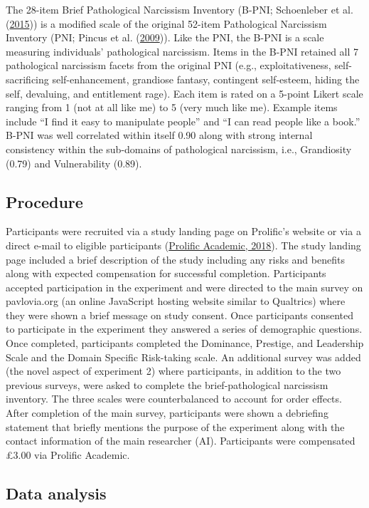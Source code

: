 \documentclass[
  donotrepeattitle,doc, 12pt, a4paper,floatsintext]{apa7}
\begin{document}
The 28-item Brief Pathological Narcissism Inventory (B-PNI; Schoenleber et al. (\protect\hyperlink{ref-schoenleber2015}{2015})) is a modified scale of the original 52-item Pathological Narcissism Inventory (PNI; Pincus et al. (\protect\hyperlink{ref-pincus2009}{2009})). Like the PNI, the B-PNI is a scale measuring individuals' pathological narcissism. Items in the B-PNI retained all 7 pathological narcissism facets from the original PNI (e.g., exploitativeness, self-sacrificing self-enhancement, grandiose fantasy, contingent self-esteem, hiding the self, devaluing, and entitlement rage). Each item is rated on a 5-point Likert scale ranging from 1 (not at all like me) to 5 (very much like me). Example items include ``I find it easy to manipulate people'' and ``I can read people like a book.'' B-PNI was well correlated within itself 0.90 along with strong internal consistency within the sub-domains of pathological narcissism, i.e., Grandiosity (0.79) and Vulnerability (0.89).
\hypertarget{procedure-1}{%
\subsection{Procedure}\label{procedure-1}}
Participants were recruited via a study landing page on Prolific's website or via a direct e-mail to eligible participants (\protect\hyperlink{ref-prolificacademic2018}{Prolific Academic, 2018}). The study landing page included a brief description of the study including any risks and benefits along with expected compensation for successful completion. Participants accepted participation in the experiment and were directed to the main survey on pavlovia.org (an online JavaScript hosting website similar to Qualtrics) where they were shown a brief message on study consent.
Once participants consented to participate in the experiment they answered a series of demographic questions. Once completed, participants completed the Dominance, Prestige, and Leadership Scale and the Domain Specific Risk-taking scale. An additional survey was added (the novel aspect of experiment 2) where participants, in addition to the two previous surveys, were asked to complete the brief-pathological narcissism inventory. The three scales were counterbalanced to account for order effects. After completion of the main survey, participants were shown a debriefing statement that briefly mentions the purpose of the experiment along with the contact information of the main researcher (AI). Participants were compensated £3.00 via Prolific Academic.
\hypertarget{data-analysis-1}{%
\subsection{Data analysis}\label{data-analysis-1}}
\end{document}
